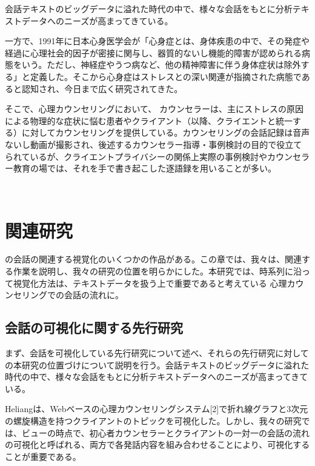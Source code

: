 \documentclass[shuuron]{kuee}
\begin{document}

会話テキストのビッグデータに溢れた時代の中で、様々な会話をもとに分析テキストデータへのニーズが高まってきている。

一方で、1991年に日本心身医学会が「心身症とは、身体疾患の中で、その発症や経過に心理社会的因子が密接に関与し、器質的ないし機能的障害が認められる病態をいう。ただし、神経症やうつ病など、他の精神障害に伴う身体症状は除外する」と定義した。そこから心身症はストレスとの深い関連が指摘された病態であると認知され、今日まで広く研究されてきた。

  そこで、心理カウンセリングにおいて、 カウンセラーは、主にストレスの原因による物理的な症状に悩む患者やクライアント（以降、クライエントと統一する）に対してカウンセリングを提供している。カウンセリングの会話記録は音声ないし動画が撮影され、後述するカウンセラー指導・事例検討の目的で役立てられているが、クライエントプライバシーの関係上実際の事例検討やカウンセラー教育の場では、それを手で書き起こした逐語録を用いることが多い。



　

\chapter{関連研究}






  の会話の関連する視覚化のいくつかの作品がある。この章では、我々は、関連する作業を説明し、我々の研究の位置を明らかにした。本研究では、時系列に沿って視覚化方法は、テキストデータを扱う上で重要であると考えている 心理カウンセリングでの会話の流れに。


\section{会話の可視化に関する先行研究}

まず、会話を可視化している先行研究について述べ、それらの先行研究に対しての本研究の位置づけについて説明を行う。会話テキストのビッグデータに溢れた時代の中で、様々な会話をもとに分析テキストデータへのニーズが高まってきている。

Heliangは、Webベースの心理カウンセリングシステム[2]で折れ線グラフと3次元の螺旋構造を持つクライアントのトピックを可視化した。しかし、我々の研究では、ビューの時点で、初心者カウンセラーとクライアントの一対一の会話の流れの可視化と呼ばれる、両方で各発話内容を組み合わせることにより、可視化することが重要である。
\end{document}
